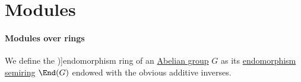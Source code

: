 \section{Modules}\label{sec:modules}

\paragraph{Modules over rings}

\begin{definition}\label{def:endomorphism_ring}
  We define the \term[ru=кольцо эндоморфизмов (\cite[130]{Курош1973ОбщаяАлгебра})]{endomorphism ring} of an \hyperref[def:abelian_group]{Abelian group} \( G \) as its \hyperref[def:endomorphism_semiring]{endomorphism semiring} \( \End(G) \) endowed with the obvious additive inverses.
\end{definition}

